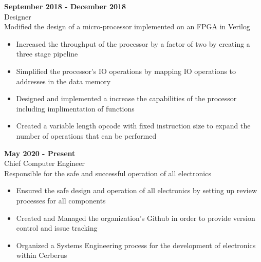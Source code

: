 {\begin{minipage}{\linewidth}
\end{minipage}
\vspace{\entrySpacing}

    \noindent\begin{minipage}{\linewidth}
 \hfill \textbf{September 2018 - December 2018}\\
Designer\hfill \\Modified the design of a micro-processor implemented on an FPGA in Verilog
\begin{itemize}[noitemsep,nolistsep]
\item Increased the throughput of the processor by a factor of two by creating a three stage pipeline
\item Simplified the processor’s IO operations by mapping IO operations to addresses in the data memory
\item Designed and implemented a increase the capabilities of the processor including implimentation of functions
\item Created a variable length opcode with fixed instruction size to expand the number of operations that can be performed
\end{itemize}


\end{minipage}
\vspace{\entrySpacing}

    \noindent\begin{minipage}{\linewidth}
 \hfill \textbf{May 2020 - Present}\\
Chief Computer Engineer\hfill \\Responsible for the safe and successful operation of all electronics
\begin{itemize}[noitemsep,nolistsep]
\item Ensured the safe design and operation of all electronics by setting up review processes for all components
\item Created and Managed the organization's Github in order to provide version control and issue tracking
\item Organized a Systems Engineering process for the development of electronics within Cerberus
\end{itemize}


\end{minipage}
\vspace{\entrySpacing}

}
